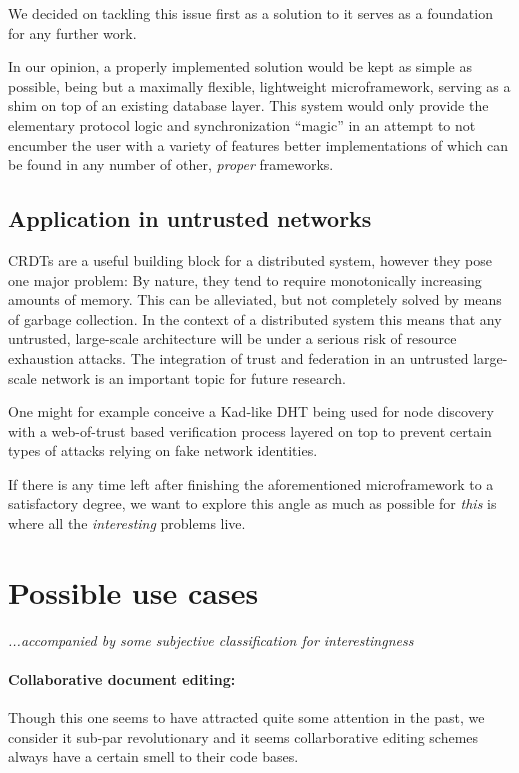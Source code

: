 \documentclass[12pt,a4paper,notitlepage]{article}
\begin{document}
We decided on tackling this issue first as a solution to it serves as a foundation for any further work.

In our opinion, a properly implemented solution would be kept as simple as possible, being but a maximally flexible,
lightweight microframework, serving as a shim on top of an existing database layer. This system would only provide the
elementary protocol logic and synchronization ``magic'' in an attempt to not encumber the user with a variety of
features better implementations of which can be found in any number of other, \emph{proper} frameworks.

\subsection{Application in untrusted networks}
CRDTs are a useful building block for a distributed system, however they pose one major problem: By nature, they tend to
require monotonically increasing amounts of memory. This can be alleviated, but not completely solved by means of
garbage collection. In the context of a distributed system this means that any untrusted, large-scale architecture will
be under a serious risk of resource exhaustion attacks. The integration of trust and federation in an untrusted
large-scale network is an important topic for future research.

One might for example conceive a Kad-like DHT being used for node discovery with a web-of-trust based verification
process layered on top to prevent certain types of attacks relying on fake network identities.

If there is any time left after finishing the aforementioned microframework to a satisfactory degree, we want to explore
this angle as much as possible for \emph{this} is where all the \emph{interesting} problems live.

\section{Possible use cases}

\emph{...accompanied by some subjective classification for interestingness}

\paragraph{Collaborative document editing:} Though this one seems to have attracted quite some attention in the past, we
consider it sub-par revolutionary and it seems collarborative editing schemes always have a certain smell to their code
bases.
\end{document}
